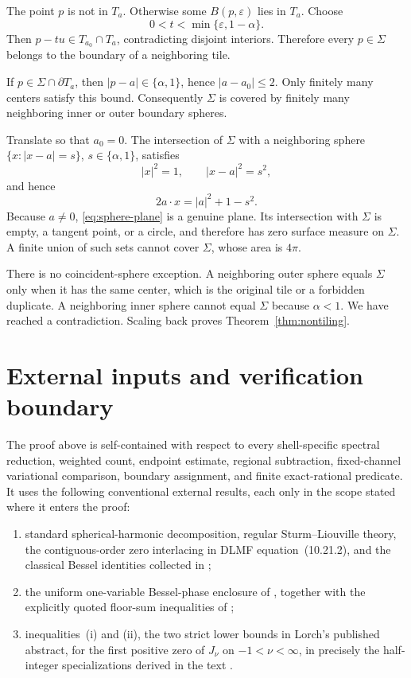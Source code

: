 \documentclass[11pt]{article}
\numberwithin{equation}{section}
\theoremstyle{definition}
\theoremstyle{remark}
\begin{document}
The point \(p\) is not in \(T_a\).  Otherwise some
\(B(p,\varepsilon)\) lies in \(T_a\).  Choose
\[
  0<t<\min\{\varepsilon,1-\alpha\}.
\]
Then \(p-tu\in T_{a_0}\cap T_a\), contradicting disjoint interiors.
Therefore every \(p\in\Sigma\) belongs to the boundary of a neighboring
tile.

If \(p\in\Sigma\cap\partial T_a\), then
\(|p-a|\in\{\alpha,1\}\), hence \(|a-a_0|\le2\).  Only finitely many
centers satisfy this bound.  Consequently \(\Sigma\) is covered by finitely
many neighboring inner or outer boundary spheres.

Translate so that \(a_0=0\).  The intersection of \(\Sigma\) with a
neighboring sphere \(\{x:|x-a|=s\}\), \(s\in\{\alpha,1\}\), satisfies
\[
  |x|^2=1,
  \qquad |x-a|^2=s^2,
\]
and hence
\begin{equation}
  2a\cdot x=|a|^2+1-s^2.
  \label{eq:sphere-plane}
\end{equation}
Because \(a\ne0\), \eqref{eq:sphere-plane} is a genuine plane.  Its
intersection with \(\Sigma\) is empty, a tangent point, or a circle, and
therefore has zero surface measure on \(\Sigma\).  A finite union of such
sets cannot cover \(\Sigma\), whose area is \(4\pi\).

There is no coincident-sphere exception.  A neighboring outer sphere equals
\(\Sigma\) only when it has the same center, which is the original tile or a
forbidden duplicate.  A neighboring inner sphere cannot equal \(\Sigma\)
because \(\alpha<1\).  We have reached a contradiction.  Scaling back proves
Theorem~\ref{thm:nontiling}.

\appendix

\section{External inputs and verification boundary}
\label{app:external-boundary}

The proof above is self-contained with respect to every shell-specific
spectral reduction, weighted count, endpoint estimate, regional subtraction,
fixed-channel variational comparison, boundary assignment, and finite
exact-rational predicate.  It uses the following conventional external results, each only
in the scope stated where it enters the proof:
\begin{enumerate}
  \item standard spherical-harmonic decomposition, regular
        Sturm--Liouville theory, the contiguous-order zero interlacing
        in DLMF equation~(10.21.2), and the classical Bessel identities
        collected in \cite{DLMF};
  \item the uniform one-variable Bessel-phase enclosure of
        \cite{FLPSphase}, together with the explicitly quoted floor-sum
        inequalities of \cite{FLPSballs,FLPSannuli};
  \item inequalities~(i) and (ii), the two strict lower bounds in Lorch's
        published abstract, for the first positive zero of \(J_\nu\) on
        \(-1<\nu<\infty\), in precisely the half-integer specializations
        derived in the text \cite{Lorch1993}.
\end{enumerate}
\end{document}
